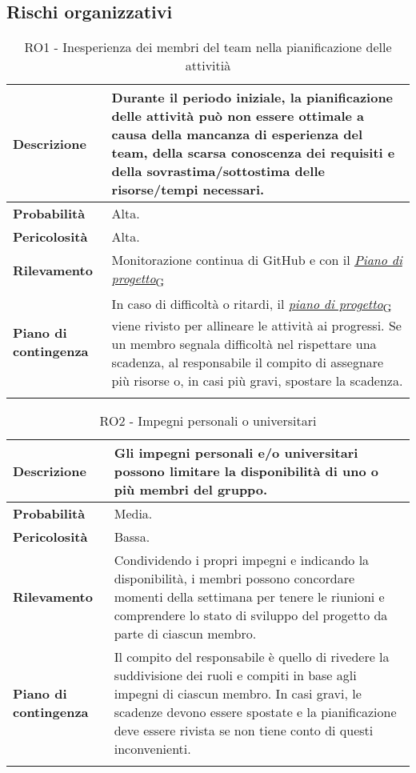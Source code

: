 \clearpage


\subsection{Rischi organizzativi}
\begin{longtable}{|l|p{10cm}|}
    \hline
    \textbf{Descrizione} & Durante il periodo iniziale, la pianificazione delle attività può non essere ottimale a causa della mancanza di esperienza del team, della scarsa conoscenza dei requisiti e della sovrastima/sottostima delle risorse/tempi necessari. \\ 
    \hline
    \textbf{Probabilità} & Alta. \\
    \hline
    \textbf{Pericolosità} & Alta. \\
    \hline
    \textbf{Rilevamento} & Monitorazione continua di GitHub e con il \href{https://7last.github.io/docs/rtb/documentazione-interna/glossario#piano-di-progetto}{\textit{Piano di progetto}\textsubscript{G}} \\
    \hline
    \textbf{Piano di contingenza} & In caso di difficoltà o ritardi, il \href{https://7last.github.io/docs/rtb/documentazione-interna/glossario#piano-di-progetto}{\textit{piano di progetto}\textsubscript{G}} viene rivisto per allineare le attività ai progressi. Se un membro segnala difficoltà nel rispettare una scadenza, al responsabile il compito di assegnare più risorse o, in casi più gravi, spostare la scadenza.\\
    \hline
    \caption{RO1 - Inesperienza dei membri del team nella pianificazione delle attivitià}
    \label{table:1}
\end{longtable}

\newpage

\begin{longtable}{|l|p{10cm}|}
    \hline
    \textbf{Descrizione} & Gli impegni personali e/o universitari possono limitare la disponibilità di uno o più membri del gruppo. \\ 
    \hline
    \textbf{Probabilità} & Media. \\
    \hline
    \textbf{Pericolosità} & Bassa. \\
    \hline
    \textbf{Rilevamento} & Condividendo i propri impegni e indicando la disponibilità, i membri possono concordare momenti della settimana per tenere le riunioni e comprendere lo stato di sviluppo del progetto da parte di ciascun membro. \\
    \hline
    \textbf{Piano di contingenza} & Il compito del responsabile è quello di rivedere la suddivisione dei ruoli e compiti in base agli impegni di ciascun membro. In casi gravi, le scadenze devono essere spostate e la pianificazione deve essere rivista se non tiene conto di questi inconvenienti.\\
    \hline
    \caption{RO2 - Impegni personali o universitari}
    \label{table:2}
\end{longtable}

